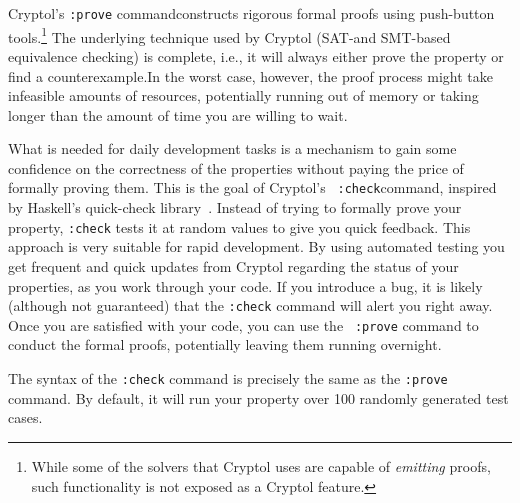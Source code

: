
Cryptol's {\tt :prove} command\indCmdProve constructs rigorous formal
proofs using push-button tools.\footnote{While some of the solvers
  that Cryptol uses are capable of \emph{emitting} proofs, such
  functionality is not exposed as a Cryptol feature.}  The underlying
technique used by Cryptol (SAT-\glosSAT and SMT-based\glosSMT
equivalence checking) is complete\indProofCompleteness, i.e., it will
always either prove the property or find a
counterexample.\indCounterExample In the worst case, however, the
proof process might take infeasible amounts of resources, potentially
running out of memory or taking longer than the amount of time you are
willing to wait.

What is needed for daily development tasks is a mechanism to gain some
confidence on the correctness of the properties without paying the
price of formally proving them.  This is the goal of Cryptol's {\tt
  :check}\indCmdCheck command, inspired by Haskell's quick-check
library~\cite{quickcheck}.  Instead of trying to formally prove your
property, {\tt :check} tests it at random values to give you quick
feedback.  This approach is very suitable for rapid development.  By
using automated testing you get frequent and quick updates from
Cryptol regarding the status of your properties, as you work through
your code. If you introduce a bug, it is likely (although not
guaranteed) that the {\tt :check} command will alert you right
away. Once you are satisfied with your code, you can use the {\tt
  :prove} command to conduct the formal proofs, potentially leaving
them running overnight.

The syntax of the {\tt :check} command is precisely the same as the
{\tt :prove} command. By default, it will run your property over 100
randomly generated test cases.

